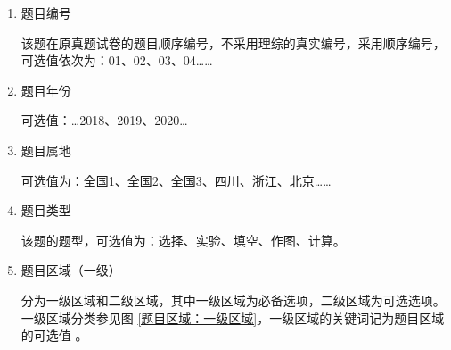 \documentclass{ctexbook}
\begin{document}
\begin{enumerate}
	\renewcommand{\labelenumi}{\arabic{enumi}.}
	\item
题目编号

该题在原真题试卷的题目顺序编号，不采用理综的真实编号，采用顺序编号，可选值依次为：01、02、03、04……

\item 
题目年份

可选值：…2018、2019、2020…

\item 
题目属地

可选值为：全国1、全国2、全国3、四川、浙江、北京……


\item 
题目类型

该题的题型，可选值为：选择、实验、填空、作图、计算。

\item 
题目区域（一级）

分为一级区域和二级区域，其中一级区域为必备选项，二级区域为可选选项。一级区域分类参见图 \ref{题目区域：一级区域}，一级区域的关键词记为题目区域的可选值	。


\end{enumerate}
\end{document}
